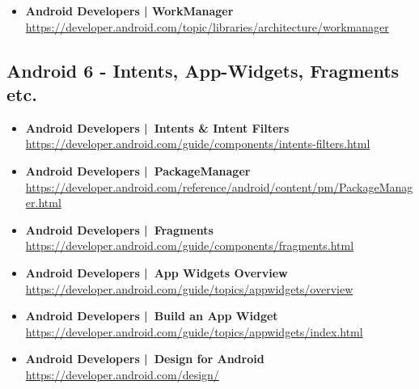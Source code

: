 \documentclass[a4paper]{article}
\begin{document}
{\begin{itemize}
		\item \textbf{Android Developers | WorkManager}\\
		\href{https://developer.android.com/topic/libraries/architecture/workmanager}
		{https://developer.android.com/topic/libraries/architecture/workmanager}			
		
	\end{itemize}
	
	\subsection{Android 6 - Intents, App-Widgets, Fragments etc.}
	
	\begin{itemize}
		
		\item \textbf{Android Developers | Intents \& Intent Filters}\\
		\href{https://developer.android.com/guide/components/intents-filters.html}
		{https://developer.android.com/guide/components/intents-filters.html}
		
		\item \textbf{Android Developers | PackageManager}\\
		\href{https://developer.android.com/reference/android/content/pm/PackageManager.html}
		{https://developer.android.com/reference/android/content/pm/PackageManager.html}
		
		\item \textbf{Android Developers | Fragments}\\
		\href{https://developer.android.com/guide/components/fragments.html}
		{https://developer.android.com/guide/components/fragments.html}
		
		\item \textbf{Android Developers | App Widgets Overview}\\
		\href{https://developer.android.com/guide/topics/appwidgets/overview}
		{https://developer.android.com/guide/topics/appwidgets/overview}
		
		\item \textbf{Android Developers | Build an App Widget}\\
		\href{https://developer.android.com/guide/topics/appwidgets/index.html}
		{https://developer.android.com/guide/topics/appwidgets/index.html}
		
		\item \textbf{Android Developers | Design for Android}\\
		\href{https://developer.android.com/design/}
		{https://developer.android.com/design/}
		

\end{itemize}}
\end{document}
